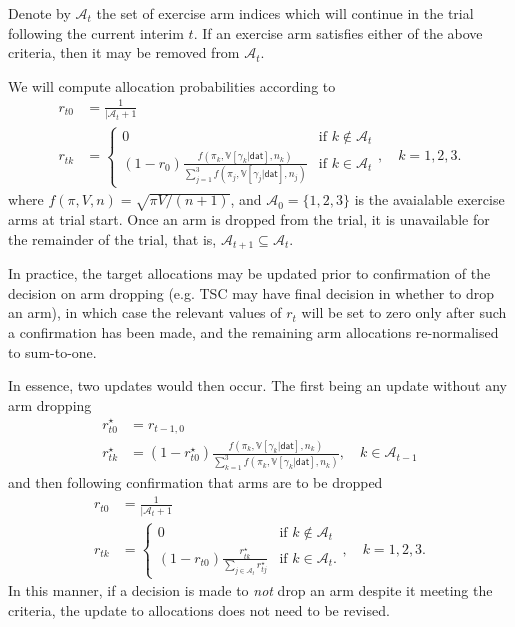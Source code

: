 \documentclass[
]{article}
\begin{document}
Denote by $\mathcal{A}_t$ the set of exercise arm indices which will continue in the trial following the current interim $t$.
If an exercise arm satisfies either of the above criteria, then it may be removed from $\mathcal{A}_t$.

We will compute allocation probabilities according to
$$
\begin{aligned}
r_{t0} &= \frac{1}{|\mathcal{A}_t + 1} \\
r_{tk} &= \begin{cases}
  0 & \text{if } k \notin \mathcal{A}_t \\
  (1 - r_0) \frac{f(\pi_k, \mathbb V[\gamma_k|\mathsf{dat}], n_k)}{\sum_{j=1}^3 f(\pi_j, \mathbb V[\gamma_j|\mathsf{dat}], n_j)} & \text{if }k\in\mathcal{A}_t
\end{cases}, \quad k=1,2,3.
\end{aligned}
$$
where $f(\pi, V, n) = \sqrt{\pi V/(n + 1)}$, and $\mathcal{A}_0 = \{1,2,3\}$ is the avaialable exercise arms at trial start.
Once an arm is dropped from the trial, it is unavailable for the remainder of the trial, that is, $\mathcal{A}_{t+1} \subseteq \mathcal{A}_t$.

In practice, the target allocations may be updated prior to confirmation of the decision on arm dropping (e.g. TSC may have final decision in whether to drop an arm), in which case the relevant values of $r_t$ 
will be set to zero only after such a confirmation has been made, and the remaining arm allocations re-normalised to sum-to-one.

In essence, two updates would then occur.
The first being an update without any arm dropping
$$
\begin{aligned}
  r_{t0}^\star &= r_{t-1,0} \\
  r_{tk}^\star &= (1 - r_{t0}^\star)\frac{f(\pi_k, \mathbb V[\gamma_k|\mathsf{dat}], n_k)}{\sum_{k=1}^3 f(\pi_k, \mathbb V[\gamma_k|\mathsf{dat}], n_k)}, \quad k\in\mathcal{A}_{t-1}
\end{aligned}
$$
and then following confirmation that arms are to be dropped
$$
\begin{aligned}
  r_{t0} &= \frac{1}{|\mathcal{A}_t + 1} \\
  r_{tk} &= \begin{cases}
    0 & \text{if } k \notin \mathcal{A}_t \\
    (1 - r_{t0}) \frac{r_{tk}^\star}{\sum_{j\in\mathcal{A}_t} r_{tj}^\star} & \text{if } k \in \mathcal{A}_t.
  \end{cases}, \quad k=1,2,3.
\end{aligned}
$$
In this manner, if a decision is made to \emph{not} drop an arm despite it meeting the criteria, the update to allocations does not need to be revised.
\end{document}
